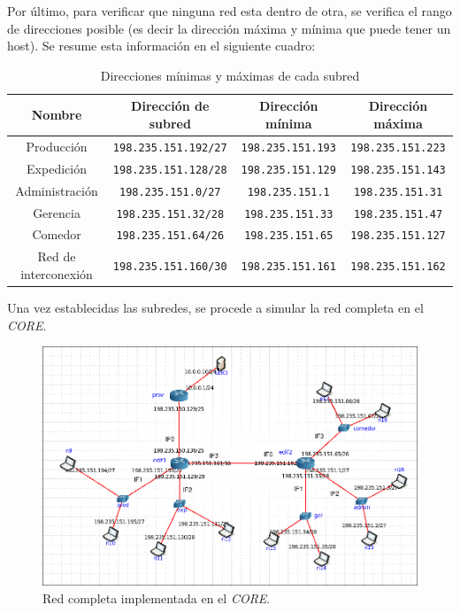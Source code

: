 Por último, para verificar que ninguna red esta dentro de otra, se verifica el rango de direcciones posible (es decir la dirección máxima y mínima que puede tener un host). Se resume esta información en el siguiente cuadro:\\


\begin{table}[H]
    \centering
    \begin{tabular}{c|c|c|c}
        \textbf{Nombre} & \textbf{Dirección de subred} & \textbf{Dirección mínima} & \textbf{Dirección máxima} \\
        \hline
        Producción & \small\texttt{198.235.151.192/27} & \small\texttt{198.235.151.193} & \small\texttt{198.235.151.223} \\ 
        Expedición & \small\texttt{198.235.151.128/28} & \small\texttt{198.235.151.129} & \small\texttt{198.235.151.143} \\ 
        Administración & \small\texttt{198.235.151.0/27} & \small\texttt{198.235.151.1} & \small\texttt{198.235.151.31} \\ 
        Gerencia & \small\texttt{198.235.151.32/28} & \small\texttt{198.235.151.33} & \small\texttt{198.235.151.47} \\ 
        Comedor & \small\texttt{198.235.151.64/26} & \small\texttt{198.235.151.65} & \small\texttt{198.235.151.127} \\ 
        Red de interconexión & \small\texttt{198.235.151.160/30} & \small\texttt{198.235.151.161} & \small\texttt{198.235.151.162} \\ 
    \end{tabular}
    \caption{Direcciones mínimas y máximas de cada subred\\}
    \label{tabla_minmax}
\end{table}

Una vez establecidas las subredes, se procede a simular la red completa en el \textit{CORE}.

\begin{figure}[H]
    \centering
    \includegraphics[scale=0.55]{Imagenes/Red.png}
    \caption{Red completa implementada en el \textit{CORE}.}
    \label{diagrama1}
\end{figure}

